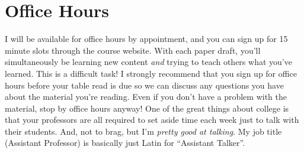 \documentclass[11pt, letterpaper]{article}
\begin{document}
\section*{Office Hours}

I will be available for office hours by appointment, and you can sign up for 15 minute slots through the course website. With each paper draft, you'll simultaneously be learning new content \textit{and} trying to teach others what you've learned. This is a difficult task! I strongly recommend that you sign up for office hours before your table read is due so we can discuss any questions you have about the material you're reading. Even if you don't have a problem with the material, stop by office hours anyway! One of the great things about college is that your professors are all required to set aside time each week just to talk with their students. And, not to brag, but I'm \textit{pretty good at talking}. My job title (Assistant Professor) is basically just Latin for ``Assistant Talker''.
\end{document}
